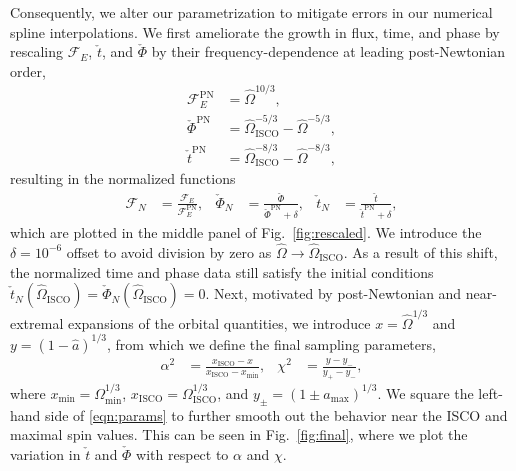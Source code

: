 \documentclass[%
 reprint,
 nofootinbib,
 amsmath,amssymb,
 aps,
 prd,
]{revtex4-2}
\begin{document}
Consequently, we alter our parametrization to mitigate errors in our numerical spline interpolations. We first ameliorate the growth in flux, time, and phase by rescaling $\mathcal{F}_E$, $\check{t}$, and $\check{\Phi}$ by their frequency-dependence at leading post-Newtonian order,
\begin{align}
    \mathcal{F}_E^\mathrm{PN} &= \hat{\Omega}^{10/3},
    \\
    \check{\Phi}^\mathrm{PN} &= \hat{\Omega}_\mathrm{ISCO}^{-5/3} - \hat{\Omega}^{-5/3},
    \\
    \check{t}^\mathrm{PN} &= \hat{\Omega}_\mathrm{ISCO}^{-8/3} - \hat{\Omega}^{-8/3},
\end{align}
resulting in the normalized functions
\begin{align}
    \mathcal{F}_N &= \frac{\mathcal{F}_E}{\mathcal{F}_E^\mathrm{PN}},
    &
    \check{\Phi}_N &= \frac{\check{\Phi}}{ \check{\Phi}^\mathrm{PN} + \delta},
    &
    \check{t}_N &= \frac{\check{t}}{\check{t}^\mathrm{PN} + \delta},
\end{align}
which are plotted in the middle panel of Fig.~\ref{fig:rescaled}. We introduce the $\delta = 10^{-6}$ offset to avoid division by zero as $\hat{\Omega} \rightarrow \hat{\Omega}_\mathrm{ISCO}$. As a result of this shift, the normalized time and phase data still satisfy the initial conditions $\check{t}_N(\hat{\Omega}_\mathrm{ISCO}) = \check{\Phi}_N(\hat{\Omega}_\mathrm{ISCO}) = 0$. Next, motivated by post-Newtonian and near-extremal expansions of the orbital quantities, we introduce $x = \hat{\Omega}^{1/3}$ and $y = (1 - \hat{a})^{1/3}$, from which we define the final sampling parameters,
\begin{align} \label{eqn:params}
    \alpha^2 &= \frac{x_\mathrm{ISCO}-x}{x_\mathrm{ISCO}-x_\mathrm{min}},
    &
    \chi^2 &= \frac{y-y_-}{y_+-y_-},
\end{align}
where $x_\mathrm{min} = \Omega_\mathrm{min}^{1/3}$, $x_\mathrm{ISCO} = \Omega_\mathrm{ISCO}^{1/3}$, and $y_\pm = (1 \pm a_\mathrm{max})^{1/3}$. We square the left-hand side of \eqref{eqn:params} to further smooth out the behavior near the ISCO and maximal spin values. This can be seen in Fig.~\ref{fig:final}, where we plot the variation in $\check{t}$ and $\check{\Phi}$ with respect to $\alpha$ and $\chi$.
\end{document}
